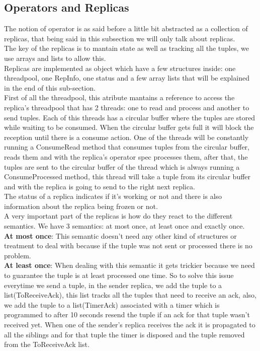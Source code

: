 \documentclass[times, 10pt, twocolumn]{article}
\begin{document}
\subsection{Operators and Replicas}
The notion of operator is as said before a little bit abstracted as a collection of replicas, that being said in this subsection we will only talk about replicas. 
\\The key of the replicas is to mantain state as well as tracking all the tuples, we use arrays and lists to allow this.
\\Replicas are implemented as object which have a few structures inside: one threadpool, one RepInfo, one status and a few array lists that will be explained in the end of this sub-section.
\\First of all the threadpool, this atribute mantains a reference to access the replica's threadpool that has 2 threads: one to read and process and another to send tuples. Each of this threads has a circular buffer where the tuples are stored while waiting to be consumed. When the circular buffer gets full it will block the reception until there is a consume action. One of the threads will be constantly running a ConsumeRead method that consumes tuples from the circular buffer, reads them and with the replica's operator spec processes them, after that, the tuples are sent to the circular buffer of the thread which is always running a ConsumeProcessed method, this thread will take a tuple from its circular buffer and with the replica is going to send to the right next replica.
\\The status of a replica indicates if it's working or not and there is also information about the replica being frozen or not.
\\A very important part of the replicas is how do they react to the different semantics. We have 3 semantics: at most once, at least once and exactly once.
\\\textbf{At most once}: This semantic doesn't need any other kind of structures or treatment to deal with because if the tuple was not sent or processed there is no problem.
\\\textbf{At least once}: When dealing with this semantic it gets trickier because we need to guarantee the tuple is at least processed one time. So to solve this issue everytime we send a tuple, in the sender replica, we add the tuple to a list(ToReceiveAck), this list tracks all the tuples that need to receive an ack, also, we add the tuple to a list(TimerAck) associated with a timer which is programmed to after 10 seconds resend the tuple if an ack for that tuple wasn't received yet. When one of the sender's replica receives the ack it is propagated to all the siblings and for that tuple the timer is disposed and the tuple removed from the ToReceiveAck list.
\end{document}
